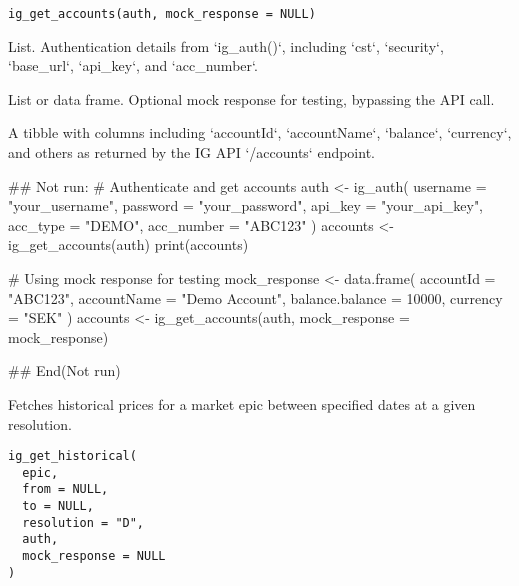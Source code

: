 \documentclass[a4paper]{book}
\begin{document}
%
\begin{Usage}
\begin{verbatim}
ig_get_accounts(auth, mock_response = NULL)
\end{verbatim}
\end{Usage}
%
\begin{Arguments}
\begin{ldescription}
\item[\code{auth}] List. Authentication details from `ig\_auth()`, including `cst`, `security`, `base\_url`, `api\_key`, and `acc\_number`.

\item[\code{mock\_response}] List or data frame. Optional mock response for testing, bypassing the API call.
\end{ldescription}
\end{Arguments}
%
\begin{Value}
A tibble with columns including `accountId`, `accountName`, `balance`, `currency`, and others as returned by the IG API `/accounts` endpoint.
\end{Value}
%
\begin{Examples}
\begin{ExampleCode}
## Not run: 
# Authenticate and get accounts
auth <- ig_auth(
  username = "your_username",
  password = "your_password",
  api_key = "your_api_key",
  acc_type = "DEMO",
  acc_number = "ABC123"
)
accounts <- ig_get_accounts(auth)
print(accounts)

# Using mock response for testing
mock_response <- data.frame(
  accountId = "ABC123",
  accountName = "Demo Account",
  balance.balance = 10000,
  currency = "SEK"
)
accounts <- ig_get_accounts(auth, mock_response = mock_response)

## End(Not run)

\end{ExampleCode}
\end{Examples}
%
\begin{Description}
Fetches historical prices for a market epic between specified dates at a given resolution.
\end{Description}
%
\begin{Usage}
\begin{verbatim}
ig_get_historical(
  epic,
  from = NULL,
  to = NULL,
  resolution = "D",
  auth,
  mock_response = NULL
)
\end{verbatim}
\end{Usage}
%
\end{document}
